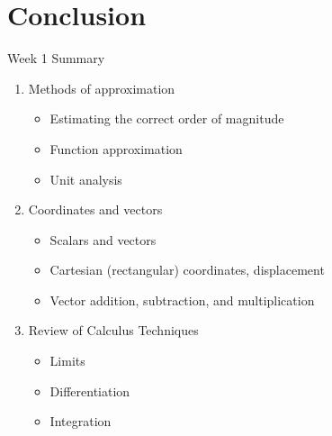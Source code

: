 \documentclass{beamer}
\begin{document}
\section{Conclusion}

\begin{frame}{Week 1 Summary}
\begin{enumerate}
\item Methods of approximation
\begin{itemize}
\item \alert{Estimating} the correct order of magnitude
\item \alert{Function} approximation
\item \alert{Unit analysis}
\end{itemize}
\item Coordinates and vectors
\begin{itemize}
\item \alert{Scalars} and \alert{vectors}
\item \alert{Cartesian} (rectangular) coordinates, displacement
\item \alert{Vector} addition, subtraction, and multiplication
\end{itemize}
\item Review of Calculus Techniques
\begin{itemize}
\item Limits
\item Differentiation
\item Integration
\end{itemize}
\end{enumerate}
\end{frame}
\end{document}
